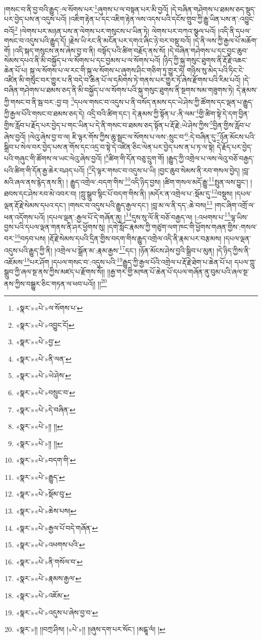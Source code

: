 །གསང་བ་ནི་བྱ་བའི་རྒྱུད་:ལ་སོགས་པར་\footnote{«སྣར་»«པེ་»ལ་སོགས་པ་}ཞུགས་པ་ལ་བསྟན་པར་མི་བྱའོ། །དེ་བཞིན་གཤེགས་པ་ཐམས་ཅད་སྡུད་པར་བྱེད་པས་ན་འདུས་པའོ། །འཇིག་རྟེན་པ་དང་འཇིག་རྟེན་ལས་འདས་པའི་དངོས་གྲུབ་ཀྱི་རྒྱུ་ཡིན་པས་ན་:འབྱུང་བའོ།\footnote{«སྣར་»«པེ་»འབྱུང་ངོ།} །ལེགས་པར་མཉན་པས་ན་ལེགས་པར་གསུངས་པ་ཡིན་ཏེ། ལེགས་པར་བཀའ་སྩལ་པའོ། །འདི་ནི་དཔལ་གསང་བ་འདུས་པའི་རྒྱུད་དོ། །རྗེས་ཡི་རང་ནི་མངོན་པར་དགའ་ཞིང་ཉེ་བར་བསྡུ་བའོ། །དེ་ནི་ལས་ཀྱི་རྒྱལ་པོ་མཆོག་གོ། །འདི་སྐད་གསུངས་ནས་ཞེས་བྱ་བ་ནི། བསྟོད་པའི་ཚིག་བརྗོད་ནས་སོ། །དེ་བཞིན་གཤེགས་པ་དང་བྱང་ཆུབ་སེམས་དཔའ་ནི་མི་བསྐྱོད་པ་ལ་སོགས་པ་དང་བྱམས་པ་ལ་སོགས་པའོ། །ཉིད་ཀྱི་སྐུ་གསུང་ཐུགས་ནི་རྡོ་རྗེ་འཆང་ཆེན་པོ་པ། སྐུ་ལ་སོགས་པ་ལ་རང་གི་སྐུ་ལ་སོགས་པ་ཞུགས་ཤིང་གཅིག་ཏུ་གྱུར་ཏེ། གཉིས་སུ་མེད་པའི་ཏིང་ངེ་འཛིན་མི་གསུང་བར་གྱུར་པ་ནི་བདེ་བ་ཆེན་པོ་ལ་དམིགས་ཏེ་གནས་པར་གྱུར་ཏོ་ཞེས་རྫོགས་པའི་རིམ་པའོ། །དེ་བཞིན་གཤེགས་པ་ཐམས་ཅད་ནི་མི་བསྐྱོད་པ་ལ་སོགས་པའི་སྐུ་གསུང་ཐུགས་ནི་སྔགས་སམ་གཟུགས་ཏེ། དེ་རྣམས་ཀྱི་གསང་བ་ནི་སྦ་བར་:བྱ་བ། \footnote{«སྣར་»«པེ་»བྱ་}དཔལ་གསང་བ་འདུས་པ་ནི་བསོད་ནམས་དང་ཡེ་ཤེས་ཀྱི་ཚོགས་དང་ལྡན་པ་རྒྱུད་ཀྱི་རྒྱལ་པོའི་གསང་བ་ཐམས་ཅད་དེ། འདྲི་བའི་ཚིག་དང་། དེ་རྣམས་ཀྱི་སྟོན་པ་:ནི་ལམ་\footnote{«སྣར་»«པེ་»ནི་ལན་}གྱི་ཚིག་སྟེ་དེ་དག་བྱིན་གྱིས་རློབ་པ་རྗོད་པར་བྱེད་པ་གང་ཡིན་པ་དེ་ནི་གསང་བ་ཐམས་ཅད་སྟོན་པ་རྡོ་རྗེ་:ཡེ་ཤེས་ཀྱིས་\footnote{«སྣར་»«པེ་»ཡེ་ཤེས་}བྱིན་གྱིས་རློབ་པ་ཞེས་བྱའོ། །ལེའུ་ཞེས་བྱ་བ་ལ། ཇི་ལྟར་གོས་ཀྱིས་ཆུ་སྦྲང་ལ་སོགས་པ་ལས་:སྲུང་བ་\footnote{«སྣར་»«པེ་»བསྲུང་བ་}:དེ་བཞིན་དུ་\footnote{«སྣར་»«པེ་»དེ་བཞིན་}ཉོན་མོངས་པའི་སྒྲིབ་པ་སེལ་བར་བྱེད་པས་ན་གོས་དང་འདྲ་བ་སྟེ་དེ་འཛིན་ཅིང་ལེན་པར་བྱེད་པས་ན་པ་ཏ་ལ་སྟེ། དེ་རྗོད་པར་བྱེད་པའི་གཞུང་གི་ཚོགས་ལ་ཡང་ལེའུ་ཞེས་བྱའོ། །\footnote{«སྣར་»«པེ་»།། །།}ཚིག་གི་དོན་བཅུ་དྲུག་གོ། །རྒྱུད་ཀྱི་འགྲེལ་པ་ལས་ལེའུ་བཅོ་བརྒྱད་པའི་ཚིག་གི་དོན་རྒྱ་ཆེར་བཤད་པའོ། །\footnote{«སྣར་»«པེ་»།། །།}དེ་ལྟར་གསང་བ་འདུས་པ་ཡི། །བྱང་ཆུབ་སེམས་ནི་རབ་གསལ་བྱེད། །བླ་མའི་ཞལ་ནས་རྙེད་ནས་ནི། །
རྒྱུད་འགྲེལ་:བདག་གིས་\footnote{«སྣར་»«པེ་»བདག་གི་}འདི་ཉིད་བྱས། །ཚིག་གསལ་མདོ་རྒྱུ་\footnote{«སྣར་»«པེ་»རྒྱུད་}སྤུན་ལས་བྱུང་། །ཐབས་དང་ཤེས་རབ་མེ་འབར་བ། །ཀླུ་སྒྲུབ་སྙིང་པོ་བདག་གིས་ནི། །མདོར་ན་འགྲེལ་པ་:སྡོམ་དུ་\footnote{«སྣར་»«པེ་»སྡོམ་བུ་}བསྡུས། །དཔལ་ལྡན་རྡོ་རྗེ་སེམས་དཔའ་དང་། །གསང་བ་འདུས་པའི་རྒྱུད་རྒྱལ་དང་། །བླ་མ་ལ་ནི་དད་:ཆེ་བས།\footnote{«སྣར་»«པེ་»ཆེས་པས།} །གང་ཞིག་འགྲོ་ལ་ཕན་འདོགས་པའོ། །དཔལ་ལྡན་:རྒྱལ་པོ་དེ་གཞོན་ནུ། །\footnote{«སྣར་»«པེ་»རྒྱལ་པོ་བདེ་གཞོན་}དུས་སུ་ལོ་ནི་བཅོ་བརྒྱད་ལ། །:འཕགས་པ་\footnote{«སྣར་»«པེ་»འཕགས་པའི་}ལྷ་ཡིས་བྱས་པའི་དཔལ་ལྡན་གནས་ནི་ཤར་ཕྱོགས་སུ། །དགེ་སློང་རྣམས་ཀྱི་གཙུག་ལག་ཁང་གི་ཕྱོགས་གཞན་གྱིས་:གསལ་བར་\footnote{«སྣར་»«པེ་»ནི་གསོལ་བ་}བཏབ་པས། །རྡོ་རྗེ་སེམས་དཔའི་དྲིན་གྱིས་བདག་གིས་རྒྱུད་འགྲེལ་འདི་ནི་རྣམ་པར་བརྩམས། །དཔལ་ལྡན་འདུས་པའི་རྒྱུད་ཀྱི་ནི། །འགྲེལ་པ་སྒྲོན་མ་:རྣམ་རྒྱས་\footnote{«སྣར་»«པེ་»རྣམས་རྒྱལ་}དང་། །ཉོན་མོངས་ཤེས་བྱའི་སྒྲིབ་པ་མུན། །དེ་ཉིད་ཀྱིས་ནི་འཇོམས་\footnote{«སྣར་»«པེ་»འཇོམ་}པར་ཤོག །དཔལ་གསང་བ་:འདུས་པའི་\footnote{«སྣར་»«པེ་»འདུས་པ་ཞེས་བྱ་བ་}རྒྱུད་ཀྱི་རྒྱལ་པོའི་འགྲེལ་པ་རྡོ་རྗེ་ཐེག་པ་ཆེན་པོ་པ། དཔལ་ཀླུ་སྒྲུབ་ཀྱི་ཞལ་སྔ་ནས་ཀྱིས་མཛད་པ་རྫོགས་སོ།། །།རྒྱ་གར་གྱི་མཁན་པོ་ཆེན་པོ་དཔལ་གཞོན་ནུ་བུམ་པའི་ཞལ་སྔ་ནས་ཀྱིས་བསྒྱུར་ཅིང་གཏན་ལ་ཕབ་པའོ།། །།\footnote{«སྣར་»།། །།བཀྲ་ཤིས། །«པེ་»།། །།ཞུས་དག་པར་སོང་། །མངྒཱ་ལཾ། །}